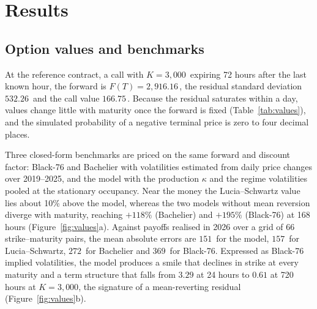 \section{Results}
\label{sec:results}

\subsection{Option values and benchmarks}
\label{sec:surface}

At the reference contract, a call with $K=3{,}000$\,\TRY{} expiring 72 hours
after the last known hour, the forward is $F(T)=2{,}916.16$\,\TRY, the
residual standard deviation $532.26$\,\TRY{} and the call value
$166.75$\,\TRY. Because the residual saturates within a day, values change
little with maturity once the forward is fixed (Table~\ref{tab:values}), and
the simulated probability of a negative terminal price is zero to four
decimal places.

Three closed-form benchmarks are priced on the same forward and discount
factor: Black-76 and Bachelier with volatilities estimated from daily price
changes over 2019--2025, and the \citet{LuciaSchwartz2002} model with the
production $\kappa$ and the regime volatilities pooled at the stationary
occupancy. Near the money the Lucia--Schwartz value lies about 10\% above the
model, whereas the two models without mean reversion diverge with maturity,
reaching $+118\%$ (Bachelier) and $+195\%$ (Black-76) at 168 hours
(Figure~\ref{fig:values}a). Against payoffs realised in 2026 over a grid of 66
strike--maturity pairs, the mean absolute errors are $151$\,\TRY{} for the
model, $157$\,\TRY{} for Lucia--Schwartz, $272$\,\TRY{} for Bachelier and
$369$\,\TRY{} for Black-76. Expressed as Black-76 implied volatilities, the
model produces a smile that declines in strike at every maturity and a term
structure that falls from $3.29$ at 24 hours to $0.61$ at 720 hours at
$K=3{,}000$, the signature of a mean-reverting residual
(Figure~\ref{fig:values}b).

